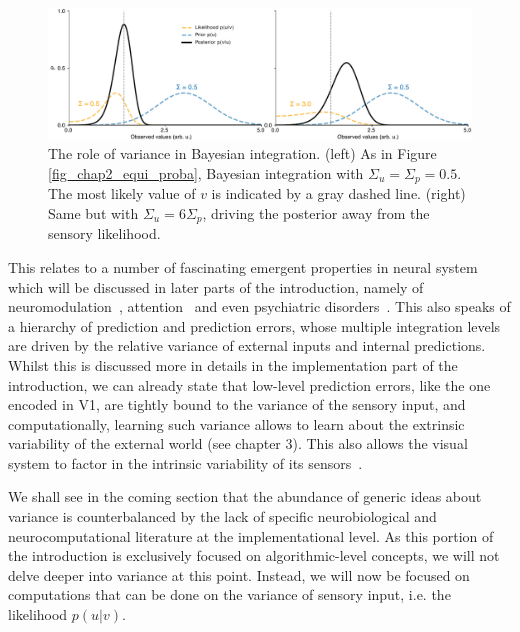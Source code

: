 \begin{figure}[h!tbp]
\vspace{0.5cm}
\centering
\includegraphics[width=1.\textwidth]{fig/chap2_fig_equi_proba_var.pdf}
\caption[The role of variance in Bayesian integration.]{The role of variance in Bayesian integration. (left) As in Figure \ref{fig_chap2_equi_proba}, Bayesian integration with $\Sigma_u = \Sigma_p = 0.5$. The most likely value of $v$ is indicated by a gray dashed line. (right) Same but with $\Sigma_u = 6\Sigma_p$, driving the posterior away from the sensory likelihood.}
\label{fig_chap2_equi_proba_var}
\end{figure}

This relates to a number of fascinating emergent properties in neural system which will be discussed in later parts of the introduction, namely of neuromodulation~\cite{friston2005theory}, attention~\cite{kanai2015cerebral} and even psychiatric disorders~\cite{adams2013computational, perrinet2014active}. This also speaks of a hierarchy of prediction and prediction errors, whose multiple integration levels are driven by the relative variance of external inputs and internal predictions. Whilst this is discussed more in details in the implementation part of the introduction, we can already state that low-level prediction errors, like the one encoded in \gls{V1}, are tightly bound to the variance of the sensory input, and computationally, learning such variance allows to learn about the extrinsic variability of the external world (see chapter 3). This also allows the visual system to factor in the intrinsic variability of its sensors~\cite{faisal2005ion, faisal2008noise}. 

We shall see in the coming section that the abundance of generic ideas about variance is counterbalanced by the lack of specific neurobiological and neurocomputational literature at the implementational level. As this portion of the introduction is exclusively focused on algorithmic-level concepts, we will not delve deeper into variance at this point. Instead, we will now be focused on computations that can be done on the variance of sensory input, i.e. the likelihood $p(u|v)$.




